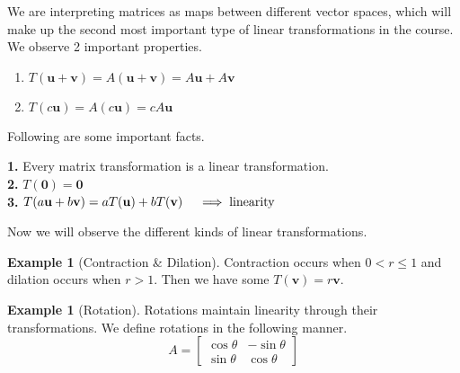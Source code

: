\documentclass{article}
\numberwithin{equation}{section}
\newenvironment{statement}[1]{\smallskip\noindent\color[rgb]{1.00,0.00,0.50} {\bf #1.}}{}
\theoremstyle{definition}
\newtheorem{ex}[thm]{Example}
\newcommand{\V}{\mathbf{v}}
\newcommand{\U}{\mathbf{u}}
\theoremstyle{adefn}
\begin{document}
	We are interpreting matrices as maps between different vector spaces, which will make up the second most important type of linear transformations in the course. We observe 2 important properties.
	\begin{enumerate}
		\itemsep0em
		\item $T(\U + \V) = A(\U+ \V) = A\U + A\V$
		\item $T(c\U) = A(c\U) = cA\U$
	\end{enumerate}
	Following are some important facts.
	\begin{framed}
		\begin{statement}{1}
			Every matrix transformation is a linear transformation.
		\end{statement}\\
		\begin{statement}{2}
			$T(\mathbf{0}) = \mathbf{0}$
		\end{statement}\\
		\begin{statement}{3}
			$T(a\U + b\V) = aT(\U) + bT(\V)\quad \implies \hbox{linearity}$
		\end{statement}
	\end{framed}
	Now we will observe the different kinds of linear transformations.
	\begin{ex}[Contraction \& Dilation]
		Contraction occurs when $0 < r \leq 1$ and dilation occurs when $r > 1$. Then we have some $T(\V) = r\V$.
	\end{ex}
	\begin{ex}[Rotation]
		Rotations maintain linearity through their transformations. We define rotations in the following manner. 
		$$A = \begin{bmatrix}
			\cos\theta & -\sin\theta \\
			\sin\theta & \cos\theta
		\end{bmatrix}$$
	\end{ex}
	
\end{document}
